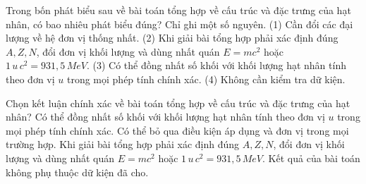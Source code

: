 \begin{ex}
Trong bốn phát biểu sau về bài toán tổng hợp về cấu trúc và đặc trưng của hạt nhân, có bao nhiêu phát biểu đúng? Chỉ ghi một số nguyên. (1) Cần đổi các đại lượng về hệ đơn vị thống nhất. (2) Khi giải bài tổng hợp phải xác định đúng $A,Z,N$, đổi đơn vị khối lượng và dùng nhất quán $E=mc^2$ hoặc $1\,u\,c^2=931,5\,MeV$. (3) Có thể đồng nhất số khối với khối lượng hạt nhân tính theo đơn vị $u$ trong mọi phép tính chính xác. (4) Không cần kiểm tra dữ kiện.
\end{ex}

\begin{ex}
Chọn kết luận chính xác về bài toán tổng hợp về cấu trúc và đặc trưng của hạt nhân?
\choice
{Có thể đồng nhất số khối với khối lượng hạt nhân tính theo đơn vị $u$ trong mọi phép tính chính xác.}
{Có thể bỏ qua điều kiện áp dụng và đơn vị trong mọi trường hợp.}
{\True Khi giải bài tổng hợp phải xác định đúng $A,Z,N$, đổi đơn vị khối lượng và dùng nhất quán $E=mc^2$ hoặc $1\,u\,c^2=931,5\,MeV$.}
{Kết quả của bài toán không phụ thuộc dữ kiện đã cho.}
\end{ex}

